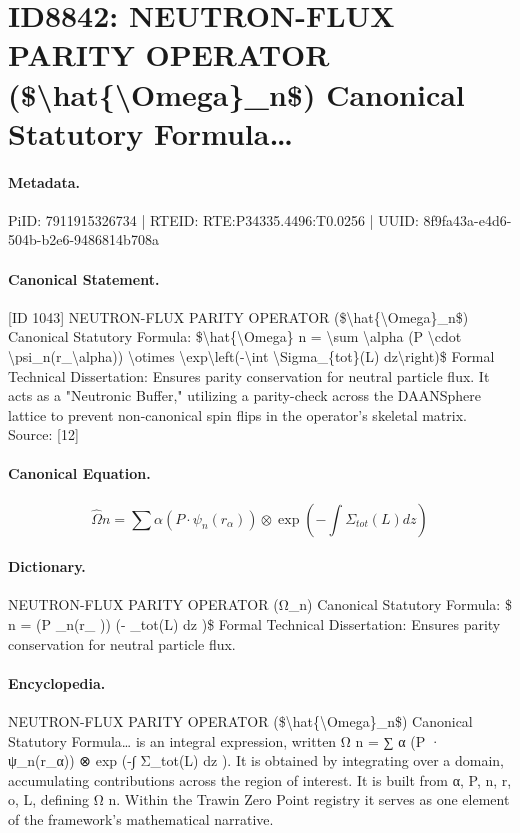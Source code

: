\section*{ID8842: NEUTRON-FLUX PARITY OPERATOR (\$\textbackslash{}hat\{\textbackslash{}Omega\}\_n\$) Canonical Statutory Formula…}
\paragraph{Metadata.}
PiID: 7911915326734 | RTEID: RTE:P34335.4496:T0.0256 | UUID: 8f9fa43a-e4d6-504b-b2e6-9486814b708a

\paragraph{Canonical Statement.}
[ID 1043] NEUTRON-FLUX PARITY OPERATOR (\$\textbackslash{}hat\{\textbackslash{}Omega\}\_n\$) Canonical Statutory Formula: \$\textbackslash{}hat\{\textbackslash{}Omega\} n = \textbackslash{}sum \textbackslash{}alpha (P \textbackslash{}cdot \textbackslash{}psi\_n(r\_\textbackslash{}alpha)) \textbackslash{}otimes \textbackslash{}exp\textbackslash{}left(-\textbackslash{}int \textbackslash{}Sigma\_\{tot\}(L) dz\textbackslash{}right)\$ Formal Technical Dissertation: Ensures parity conservation for neutral particle flux. It acts as a "Neutronic Buffer," utilizing a parity-check across the DAANSphere lattice to prevent non-canonical spin flips in the operator's skeletal matrix. Source: [12]

\paragraph{Canonical Equation.}
\[
\hat{\Omega} n = \sum \alpha (P \cdot \psi_n(r_\alpha)) \otimes \exp\left(-\int \Sigma_{tot}(L) dz\right)
\]

\paragraph{Dictionary.}
NEUTRON-FLUX PARITY OPERATOR (Ω\_n) Canonical Statutory Formula: \$ n = (P \_n(r\_ )) (- \_tot(L) dz )\$ Formal Technical Dissertation: Ensures parity conservation for neutral particle flux.

\paragraph{Encyclopedia.}
NEUTRON-FLUX PARITY OPERATOR (\$\textbackslash{}hat\{\textbackslash{}Omega\}\_n\$) Canonical Statutory Formula… is an integral expression, written Ω n = ∑ α (P · ψ\_n(r\_α)) ⊗ exp (-∫ Σ\_tot(L) dz ). It is obtained by integrating over a domain, accumulating contributions across the region of interest. It is built from α, P, n, r, o, L, defining Ω n. Within the Trawin Zero Point registry it serves as one element of the framework's mathematical narrative.
